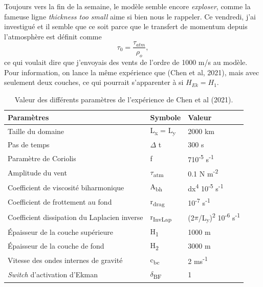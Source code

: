 \documentclass[10pt]{article}
\numberwithin{equation}{section}
\begin{document}
Toujours vers la fin de la semaine, le modèle semble encore \emph{exploser}, comme la fameuse ligne \emph{thickness too small} aime si bien nous le rappeler. 
Ce vendredi, j'ai investigué et il semble que ce soit parce que le transfert de momentum depuis l'atmosphère est définit comme 
\begin{equation}
\tau_0 = \frac{\tau_{atm}}{\rho_o},
\end{equation}
ce qui voulait dire que j'envoyais des vents de l'ordre de 1000 m/s au modèle.
Pour information, on lance la même expérience que (Chen et al, 2021), mais avec seulement deux couches, ce qui pourrait s'apparenter à si \(H_{Ek} = H_1\).

\begin{table}[htbp]
\caption{Valeur des différents paramètres de l'expérience de Chen et al (2021).}
\centering
\begin{tabular}{lll}
\hline
\hline
Paramètres & Symbole & Valeur\\[0pt]
\hline
Taille du domaine & L\textsubscript{x} = L\textsubscript{y} & 2000 km\\[0pt]
Pas de temps & \(\Delta\) t & 300 s\\[0pt]
Paramètre de Coriolis & f & 7\texttimes{}10\textsuperscript{-5} s\textsuperscript{-1}\\[0pt]
Amplitude du vent & \(\tau\)\textsubscript{atm} & 0.1 N m\textsuperscript{-2}\\[0pt]
Coefficient de viscosité biharmonique & A\textsubscript{bh} & dx\textsuperscript{4} \texttimes{}10\textsuperscript{-5} s\textsuperscript{-1}\\[0pt]
Coefficient de frottement au fond & r\textsubscript{drag} & 10\textsuperscript{-7} s\textsuperscript{-1}\\[0pt]
Coefficient dissipation du Laplacien inverse & r\textsubscript{InvLap} & (2\(\pi\)/L\textsubscript{y})\textsuperscript{2} \texttimes{} 10\textsuperscript{-6} s\textsuperscript{-1}\\[0pt]
Épaisseur de la couche supérieure & H\textsubscript{1} & 1000 m\\[0pt]
Épaisseur de la couche de fond & H\textsubscript{2} & 3000 m\\[0pt]
Vitesse des ondes internes de gravité & c\textsubscript{bc} & 2 ms\textsuperscript{-1}\\[0pt]
\emph{Switch} d'activation d'Ekman & \(\delta\)\textsubscript{BF} & 1\\[0pt]
\hline
\end{tabular}
\end{table}
\end{document}
